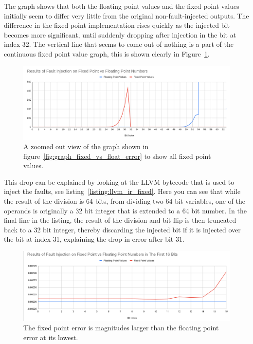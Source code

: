 The graph shows that both the floating point values and the fixed point values initially seem to differ very little from the original non-fault-injected outputs. The difference in the fixed point implementation rises quickly as the injected bit becomes more significant, until suddenly dropping after injection in the bit at index 32. The vertical line that seems to come out of nothing is a part of the continuous fixed point value graph, this is shown clearly in Figure~\ref{fig:zoomed_out_graph}.
\begin{figure}
    \centering
    \includegraphics[width=0.75\linewidth]{Images/zoomed_out_graph.png}
    \caption{A zoomed out view of the graph shown in figure~\ref{fig:graph_fixed_vs_float_error} to show all fixed point values.}
    \label{fig:zoomed_out_graph}
\end{figure}

This drop can be explained by looking at the LLVM bytecode that is used to inject the faults, see listing~\ref{listing:llvm_ir_fixed}. Here you can see that while the result of the division is 64 bits, from dividing two 64 bit variables, one of the operands is originally a 32 bit integer that is extended to a 64 bit number. In the final line in the listing, the result of the division and bit flip is then truncated back to a 32 bit integer, thereby discarding the injected bit if it is injected over the bit at index 31, explaining the drop in error after bit 31.

\begin{figure}[h!]
    \centering
    \includegraphics[width=\linewidth]{graph_fault_injection_fix_vs_float_first_16_bits.png}
    \caption{The fixed point error is magnitudes larger than the floating point error at its lowest.}
    \label{fig:graph_fixed_vs_float_error_first_16}
\end{figure}


